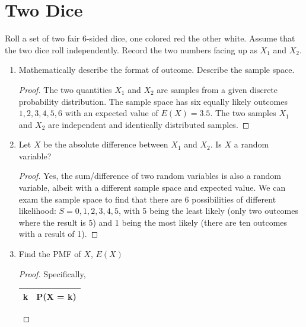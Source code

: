 \documentclass{article}
\begin{document}
\maketitle 
\setlength{\parindent}{0pt}

\section{Two Dice}
Roll a set of two fair 6-sided dice, one colored red the other white. Assume that the two dice
roll independently. Record the two numbers facing up as $X_1$ and $X_2$.

\begin{enumerate}[label=\roman*)]
    \item  Mathematically describe the format of outcome. Describe the sample space.
        \begin{proof}
            The two quantities $X_1$ and $X_2$ are samples from a given discrete
            probability distribution. The sample space has six equally likely
            outcomes ${1, 2, 3, 4, 5, 6}$ with an expected value of $E(X) =
            3.5$. The two samples $X_1$ and $X_2$ are independent and
            identically distributed samples. 
        \end{proof}
    \item Let $X$ be the absolute difference between $X_1$ and $X_2$. Is $X$ a random variable?
        \begin{proof}
            Yes, the sum/difference of two random variables is also a random
            variable, albeit with a different sample space and expected value.
            We can exam the sample space to find that there are 6 possibilities
            of different likelihood: $S = {0, 1, 2, 3, 4, 5}$, with 5 being the
            least likely (only two outcomes where the result is 5) and 1 being
            the most likely (there are ten outcomes with a result of 1).
        \end{proof}
    \item Find the PMF of $X$, $E(X)$
        \begin{proof}
            Specifically, 
            \begin{center}
            \begin{tabular}{||c c||} 
                \hline
                k & P(X = k)\\ [0.5ex] 
                \hline\hline

\end{tabular}
\end{center}
\end{proof}
\end{enumerate}
\end{document}
